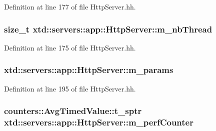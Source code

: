 Definition at line 177 of file Http\+Server.\+hh.

\subsubsection[{\texorpdfstring{m\+\_\+nb\+Thread}{m_nbThread}}]{\setlength{\rightskip}{0pt plus 5cm}size\+\_\+t xtd\+::servers\+::app\+::\+Http\+Server\+::m\+\_\+nb\+Thread\hspace{0.3cm}{\ttfamily [protected]}}\hypertarget{classxtd_1_1servers_1_1app_1_1HttpServer_a2f0812d24ccfd55e943f3144c672b473}{}\label{classxtd_1_1servers_1_1app_1_1HttpServer_a2f0812d24ccfd55e943f3144c672b473}


Definition at line 175 of file Http\+Server.\+hh.

\subsubsection[{\texorpdfstring{m\+\_\+params}{m_params}}]{ xtd\+::servers\+::app\+::\+Http\+Server\+::m\+\_\+params\hspace{0.3cm}{\ttfamily [protected]}}\hypertarget{classxtd_1_1servers_1_1app_1_1HttpServer_ac4f9a2c40867f4f2ba8d30ec9876e51e}{}\label{classxtd_1_1servers_1_1app_1_1HttpServer_ac4f9a2c40867f4f2ba8d30ec9876e51e}


Definition at line 195 of file Http\+Server.\+hh.

\subsubsection[{\texorpdfstring{m\+\_\+perf\+Counter}{m_perfCounter}}]{\setlength{\rightskip}{0pt plus 5cm}counters\+::\+Avg\+Timed\+Value\+::t\+\_\+sptr xtd\+::servers\+::app\+::\+Http\+Server\+::m\+\_\+perf\+Counter\hspace{0.3cm}{\ttfamily [protected]}}\hypertarget{classxtd_1_1servers_1_1app_1_1HttpServer_afc57d4c9bc2f9a47440e3c54eb92b1fb}{}\label{classxtd_1_1servers_1_1app_1_1HttpServer_afc57d4c9bc2f9a47440e3c54eb92b1fb}


